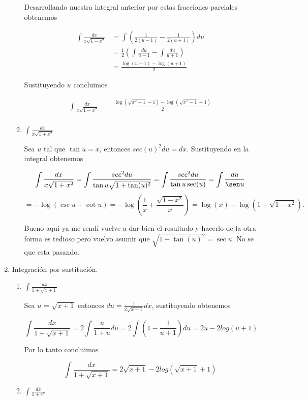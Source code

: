 \documentclass[letterpaper]{article}
\theoremstyle{definition}
\theoremstyle{lemathm}
\theoremstyle{lemademthm}
\begin{document}
\begin{enumerate}
\begin{enumerate}
			Desarrollando nuestra integral anterior por estas fracciones parciales obtenemos

			\begin{align*}
				\int \frac{dx}{x\sqrt{1-x^2}} &= \int \left(\frac{1}{2(u-1)} - \frac{1}{2(u+1)}\right)du\\
				&= \frac{1}{2} \left(\int \frac{du}{u-1} - \int \frac{du}{u+1}\right)\\
				&= \frac{\log(u-1) - \log(u+1)}{2}
			\end{align*}

			Sustituyendo $u$ concluimos

			\begin{align*}
				\int \frac{dx}{x\sqrt{1-x^2}} &= \frac{\log(\sqrt{x^2-1}-1) - \log(\sqrt{x^2-1}+1)}{2}\\
			\end{align*}

            \item $\int \frac{dx}{x\sqrt{1+x^2}}$
			
			Sea $u$ tal que $\tan u = x$, entonces $sec(u)^2 du = dx$. Sustituyendo en la integral obtenemos

			\[\int \frac{dx}{x\sqrt{1+x^2}} = \int \frac{sec^2 du}{\tan u\sqrt{1+\tan(u)^2}} = \int \frac{sec^2 du}{\tan u\sec(u)} = \int \frac{du}{\sen u}\]
			\[ = -\log(\csc u + \cot u) = -\log(\frac{1}{x} + \frac{\sqrt{1-x^2}}{x}) = \log(x) - \log(1 + \sqrt{1-x^2}).\]

			Bueno aquí ya me rendí vuelve a dar bien el resultado y hacerlo de la otra forma es tedioso pero vuelvo asumir que $\sqrt{1+\tan(u)^2} = \sec u$. No se que esta pasando.
		\end{enumerate}

		\item Integración por sustitución.
        
        \begin{enumerate}
            \item $\int \frac{dx}{1 + \sqrt{x+1}}$
			
			Sea $u$ = $\sqrt{x+1}$ entonces $du = \frac{1}{2\sqrt{x+1}} dx$, sustituyendo obtenemos

			\[\int \frac{dx}{1 + \sqrt{x+1}} = 2 \int \frac{u}{1 + u}du = 2\int \left(1 - \frac{1}{u + 1}\right)du = 2u - 2log(u + 1)\]

			Por lo tanto concluimos

			\[\int \frac{dx}{1 + \sqrt{x+1}} = 2\sqrt{x+1} - 2log(\sqrt{x+1}+1)\]

            \item $\int \frac{dx}{1+e^x}$
			

\end{enumerate}
\end{enumerate}
\end{document}
